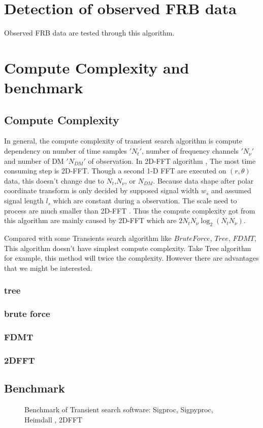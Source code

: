 \documentclass[twocolumn]{aastex61}
\begin{document}
\section{Detection of observed FRB data}
Observed FRB data are tested through this algorithm. 
\section{Compute Complexity and benchmark}
\subsection{Compute Complexity}
In general, the compute complexity of transient search algorithm is compute dependency on number of time samples $'N_t'$, number of frequency channels $'N_{\nu}'$ and number of DM $'N_{DM}'$ of observation. In 2D-FFT algorithm , The most time consuming step is 2D-FFT. Though a second 1-D FFT are executed on $(r,\theta)$ data, this doesn't change due to $N_t$,$N_{\nu}$, or $N_{DM}$. Because data shape after polar coordinate transform is only decided by supposed signal width $w_s$ and assumed signal length $l_s$ which are constant during a observation. The scale need to process are much smaller than 2D-FFT . Thus the compute complexity got from this algorithm are mainly caused by 2D-FFT which are $2N_t N_{\nu} \log_2(N_t N_{\nu})$.

Compared with some Transients search algorithm like $Brute Force$, $Tree$, $FDMT$, This algorithm doesn't have simplest compute complexity. Take Tree algorithm for example, this method will twice the complexity.  However there are advantages that we might be interested.
\subsubsection*{tree}
\subsubsection*{brute force}
\subsubsection*{FDMT}
\subsubsection*{2DFFT}
\subsection{Benchmark}
\begin{figure}[ht!]
\caption{Benchmark of Transient search software: Sigproc, Sigpyproc, Heimdall , 2DFFT \label{fig:benchmark}}
\end{figure} 
 
\end{document}
